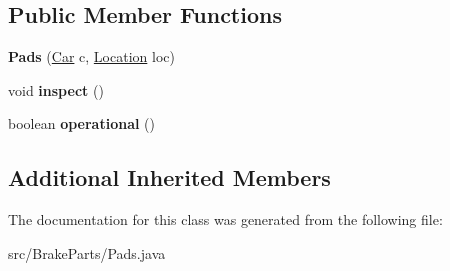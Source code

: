 \subsection*{Public Member Functions}
\begin{DoxyCompactItemize}
\item 
\hypertarget{classBrakeParts_1_1Pads_a70cfbd2148157820ffd922dd21c6abf2}{}{\bfseries Pads} (\hyperlink{classCars_1_1Car}{Car} c, \hyperlink{enumEnums_1_1Location}{Location} loc)\label{classBrakeParts_1_1Pads_a70cfbd2148157820ffd922dd21c6abf2}

\item 
\hypertarget{classBrakeParts_1_1Pads_a1761c1fc50305faf97a1e6eb41810f85}{}void {\bfseries inspect} ()\label{classBrakeParts_1_1Pads_a1761c1fc50305faf97a1e6eb41810f85}

\item 
\hypertarget{classBrakeParts_1_1Pads_ab54aee108e7221108ca46b1311b6be6c}{}boolean {\bfseries operational} ()\label{classBrakeParts_1_1Pads_ab54aee108e7221108ca46b1311b6be6c}

\end{DoxyCompactItemize}
\subsection*{Additional Inherited Members}


The documentation for this class was generated from the following file\+:\begin{DoxyCompactItemize}
\item 
src/\+Brake\+Parts/Pads.\+java\end{DoxyCompactItemize}

